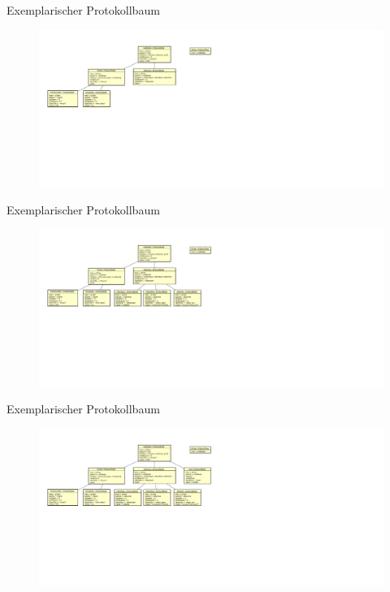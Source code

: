 \begin{frame}{Exemplarischer Protokollbaum}
    \begin{figure}
    	\centering
    	\includegraphics[width=\textwidth]{./images/prototree/6.pdf}
    \end{figure}
\end{frame}

\begin{frame}{Exemplarischer Protokollbaum}
    \begin{figure}
    	\centering
    	\includegraphics[width=\textwidth]{./images/prototree/5.pdf}
    \end{figure}
\end{frame}

\begin{frame}{Exemplarischer Protokollbaum}
    \begin{figure}
    	\centering
    	\includegraphics[width=\textwidth]{./images/prototree/4.pdf}
    \end{figure}
\end{frame}


